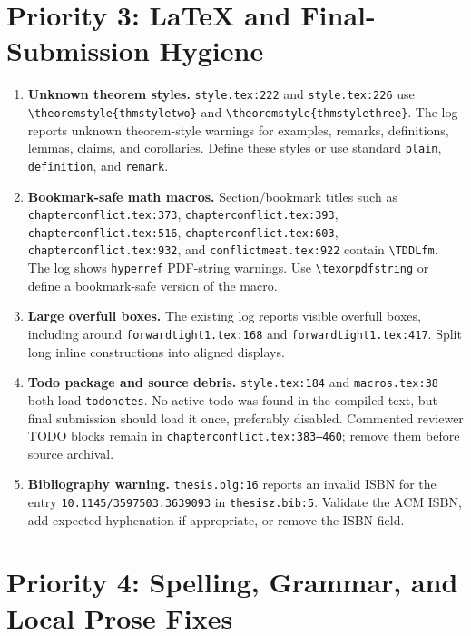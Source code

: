 \documentclass[11pt,a4paper]{article}
\newcommand{\sev}[1]{\textbf{#1}}
\newcommand{\loc}[1]{\texttt{#1}}
\begin{document}
\section*{Priority 3: LaTeX and Final-Submission Hygiene}

\begin{enumerate}
  \item \sev{Unknown theorem styles.} \loc{style.tex:222} and \loc{style.tex:226}
  use \verb|\theoremstyle{thmstyletwo}| and \verb|\theoremstyle{thmstylethree}|.
  The log reports unknown theorem-style warnings for examples, remarks,
  definitions, lemmas, claims, and corollaries. Define these styles or use standard
  \verb|plain|, \verb|definition|, and \verb|remark|.

  \item \sev{Bookmark-safe math macros.} Section/bookmark titles such as
  \loc{chapterconflict.tex:373}, \loc{chapterconflict.tex:393},
  \loc{chapterconflict.tex:516}, \loc{chapterconflict.tex:603},
  \loc{chapterconflict.tex:932}, and \loc{conflictmeat.tex:922} contain
  \verb|\TDDLfm|. The log shows \loc{hyperref} PDF-string warnings. Use
  \verb|\texorpdfstring| or define a bookmark-safe version of the macro.

  \item \sev{Large overfull boxes.} The existing log reports visible overfull boxes,
  including around \loc{forwardtight1.tex:168} and \loc{forwardtight1.tex:417}.
  Split long inline constructions into aligned displays.

  \item \sev{Todo package and source debris.} \loc{style.tex:184} and
  \loc{macros.tex:38} both load \loc{todonotes}. No active todo was found in the
  compiled text, but final submission should load it once, preferably disabled.
  Commented reviewer TODO blocks remain in \loc{chapterconflict.tex:383--460};
  remove them before source archival.

  \item \sev{Bibliography warning.} \loc{thesis.blg:16} reports an invalid ISBN for
  the entry \loc{10.1145/3597503.3639093} in \loc{thesisz.bib:5}. Validate the ACM
  ISBN, add expected hyphenation if appropriate, or remove the ISBN field.
\end{enumerate}

\section*{Priority 4: Spelling, Grammar, and Local Prose Fixes}
\end{document}
